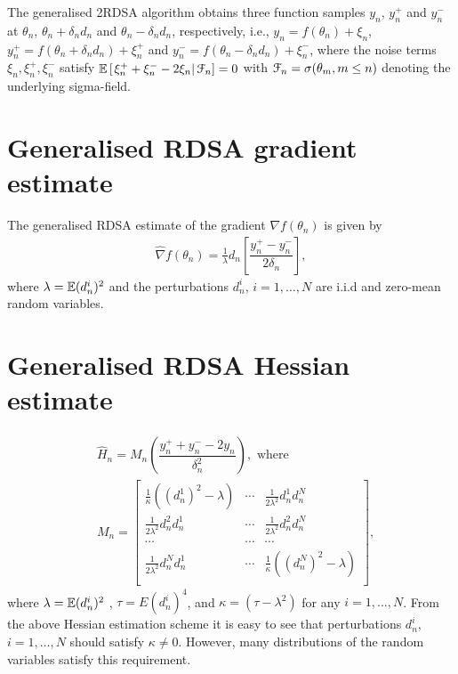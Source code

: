 The generalised 2RDSA algorithm obtains three function samples $y_n$, $y_n^+$ and $y_n^-$ at $\theta_n$, $\theta_n+\delta_n d_n$ and $\theta_n - \delta_n d_n$, respectively, i.e.,
$y_n = f(\theta_n) + \xi_n$, $y_n^+ = f(\theta_n+\delta_n d_n) + \xi_n^+$ and 
$y_n^- = f(\theta_n-\delta_n d_n) + \xi_n^-$,
where the noise terms $\xi_n, \xi_n^+, \xi_n^-$ satisfy $\mathbb{E}\left[\left.\xi_n^+ + \xi_n^- - 2\xi_n \right| \mathcal{F}_n\right] = 0$ with $\mathcal{F}_n = \sigma(\theta_m,m\le n)$ denoting the underlying sigma-field. 

\section{Generalised RDSA gradient estimate}
The generalised RDSA estimate of the gradient $\nabla f(\theta_n)$ is given by
\begin{align}
\label{eq:grad-gen}
\widehat\nabla f(\theta_n) = \frac1{\lambda} d_n \left[ \dfrac{y_n^+ - y_n^-}{2\delta_n}\right],
\end{align}
where $\lambda = \mathbb{E}(d_n^i)^2 $ and the perturbations $d_n^i$, $i=1,\ldots,N$ are i.i.d and zero-mean random variables. 

\section{Generalised RDSA Hessian estimate}
\begin{align}
\label{eq:2rdsa-estimate-gen}
&\widehat H_n = M_n \left(\dfrac{y_n^+ + y_n^- - 2 y_n}{\delta_n^2}\right), \text{ where }\\
& M_n =
\left[
\begin{array}{ccc}
\frac{1}{\kappa}\left((d_n^1)^2\!-\lambda\right) & \cdots & \frac{1}{2 \lambda^2}d_n^1 d_n^N\\
\frac{1}{2 \lambda^2}d_n^2 d_n^1  &  \cdots & \frac{1}{2 \lambda^2}d_n^2 d_n^N\\
\cdots&\cdots&\cdots\\
\frac{1}{2 \lambda^2}d_n^N d_n^1 & \cdots &  \frac{1}{\kappa}\left((d_n^N)^2-\lambda\right) \\
\end{array}
\right],\nonumber
\end{align}
where $\lambda = \mathbb{E}(d_n^i)^2 $ , $\tau = E (d_n^i)^4$, and $\kappa = \left(\tau - \lambda^2\right)$ for any $i=1,\ldots,N$.
From the above Hessian estimation scheme it is easy to see that perturbations $d_n^i$, $i=1,\ldots,N$ should satisfy  $\kappa \neq 0$. However, many distributions of the random variables satisfy this requirement. 


